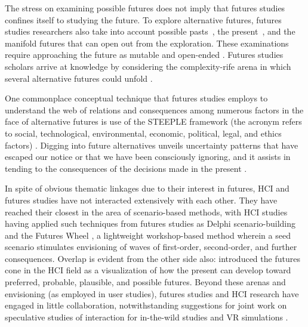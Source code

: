 The stress on examining possible futures does not imply that futures studies confines itself to studying the future. To explore alternative futures, futures studies researchers also take into account possible pasts~\cite{sardar_colonizing_1993, bendorLookingBackwardFuture2021}, the present~\cite{poliIntroductionAnticipationStudies2017, millerSensingMakingsenseFutures2018, bellWhatWeMean1996}, and the manifold futures that can open out from the exploration. These examinations require approaching the future as mutable and open-ended \cite{jouvenelArtConjecture1967, adamFutureMattersAction2007, poli_anticipation_2019}. Futures studies scholars arrive at knowledge by considering the complexity-rife arena in which several alternative futures could unfold \cite{poliIntroductionAnticipationStudies2017}. 

One commonplace conceptual technique that futures studies employs to understand the web of relations and consequences among numerous factors in the face of alternative futures is use of the STEEPLE framework (the acronym refers to social, technological, environmental, economic, political, legal, and ethics factors) \cite{aguilarScanningBusinessEnvironment1967, saritasMappingIssuesEnvisaging2012}. Digging into future alternatives unveils uncertainty patterns that have escaped our notice or that we have been consciously ignoring, and it assists in tending to the consequences of the decisions made in the present \cite{poliIntroductionAnticipationStudies2017, millerSensingMakingsenseFutures2018, adamFutureMattersAction2007}.

In spite of obvious thematic linkages due to their interest in futures, HCI and futures studies have not interacted extensively with each other. They have reached their closest in the area of scenario-based methods, with HCI studies having applied such techniques from futures studies as Delphi scenario-building \cite {mankoffLookingYesterdayTomorrow2013a} and the Futures Wheel \cite{epp2022reinventing}, a lightweight workshop-based method wherein a seed scenario stimulates envisioning of waves of first-order, second-order, and further consequences. Overlap is evident from the other side also: \citeauthor{dunneSpeculativeEverythingDesign2013a} introduced the futures cone \cite{taylorAlternativeWorldScenarios1993} in the HCI field as a visualization of how the present can develop toward preferred, probable, plausible, and possible futures. 
Beyond these arenas and envisioning (as employed in user studies), futures studies and HCI research have engaged in little collaboration, notwithstanding suggestions for joint work on speculative studies of interaction for in-the-wild studies \cite{elsden_speculative_2017,salovaaraEvaluationPrototypesProblem2017} and VR simulations \cite{simeone2022immersive}. 

